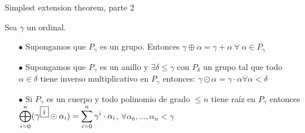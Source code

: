 \documentclass[10pt,spanish]{beamer}
\begin{document}
\begin{frame}{Simplest extension theorem, parte 2}


Sea $\gamma$ un ordinal.
\begin{itemize}
	\item[$\bullet$] Supongamos que $P_\gamma$ es un grupo. Entonces $\gamma \oplus \alpha = \gamma + \alpha\ \forall\ \alpha \in P_\gamma$ %
	\item[$\bullet$]  Supongamos que $P_\gamma$ es un anillo y $\exists \delta \leq \gamma$ con $P_\delta$ un grupo tal que todo $\alpha \in \delta$ tiene inverso multiplicativo en $P_\gamma$ entonces: $\gamma \odot \alpha = \gamma \cdot \alpha \forall \alpha < \delta$
	\item[$\bullet$] Si $P_\gamma$ es un cuerpo y todo polinomio de grado $\leq n$ tiene raíz en $P_\gamma$ entonces $\displaystyle \bigoplus_{i=0}^n (\mathlarger{\gamma}^{\boxed{i}} \odot \alpha_i) = \sum_{i=0}^n \gamma^i \cdot \alpha_i$,
	$\forall \alpha_0,...,\alpha_n < \gamma$
\end{itemize}










\end{frame}
\end{document}
